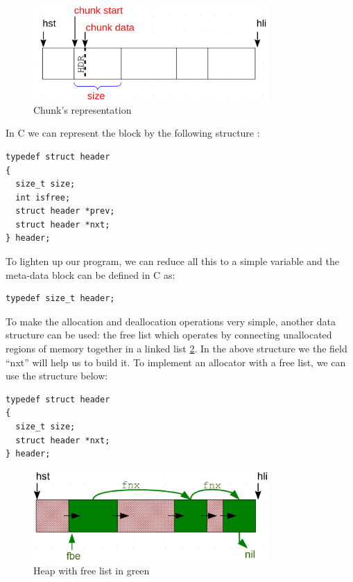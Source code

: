 \begin{figure}[htbp]
    \begin{center}
        \includegraphics[width=0.8\textwidth]{figures/chunk}
    \caption{Chunk's representation }
    \label{chunkrep}
    \end{center}
\end{figure}

In C we can represent the block by the following structure :
\begin{lstlisting}[style=cstyle]
typedef struct header
{
  size_t size;
  int isfree;
  struct header *prev;
  struct header *nxt;
} header;
\end{lstlisting}

To lighten up our program, we can reduce all this to a simple variable and the meta-data block can be defined in C as:
\begin{lstlisting}[style=cstyle]
typedef size_t header;
\end{lstlisting}

To make the allocation and deallocation operations very simple, another data structure can be used: the free list which operates by connecting unallocated regions of memory together in a linked list \ref{freelist}. In the above structure we the field ``nxt'' will help us to build it.
To implement an allocator with a free list, we can use the structure below:
\begin{lstlisting}[style=cstyle]
typedef struct header
{
  size_t size;			
  struct header *nxt;
} header;
\end{lstlisting}

\begin{figure}[htbp]
    \begin{center}
        \includegraphics[width=0.8\textwidth]{figures/freelist}
    \caption{Heap with free list in green}
    \label{freelist}
    \end{center}
\end{figure}

